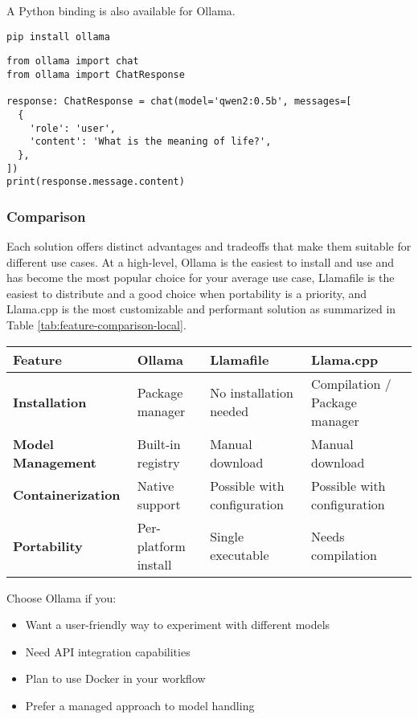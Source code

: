 A Python binding is also available for Ollama.

\begin{verbatim}
pip install ollama
\end{verbatim}

\begin{verbatim}
from ollama import chat
from ollama import ChatResponse

response: ChatResponse = chat(model='qwen2:0.5b', messages=[
  {
    'role': 'user',
    'content': 'What is the meaning of life?',
  },
])
print(response.message.content)
\end{verbatim}

\subsubsection{Comparison}

Each solution offers distinct advantages and tradeoffs that make them suitable for different use cases. At a high-level, Ollama is the easiest to install and use and has become the most popular choice for your average use case, Llamafile is the easiest to distribute and a good choice when portability is a priority, and Llama.cpp is the most customizable and performant solution as summarized in Table \ref{tab:feature-comparison-local}.

\begin{table*}[h!]
\centering
\caption{lama.cpp vs Ollama vs Llamafile Comparison}
\label{tab:feature-comparison-local}
\begin{tabular}{llll}
\toprule
Feature & Ollama & Llamafile & Llama.cpp \\
\midrule
\textbf{Installation} & Package manager & No installation needed & Compilation / Package manager \\
\textbf{Model Management} & Built-in registry & Manual download & Manual download \\
\textbf{Containerization} & Native support & Possible with configuration & Possible with configuration \\
\textbf{Portability} & Per-platform install & Single executable & Needs compilation \\
\bottomrule
\end{tabular}
\end{table*}

Choose Ollama if you:
\begin{itemize}
\item Want a user-friendly way to experiment with different models
\item Need API integration capabilities
\item Plan to use Docker in your workflow
\item Prefer a managed approach to model handling
\end{itemize}

